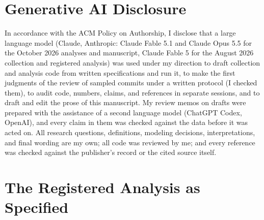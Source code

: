 \documentclass[acmsmall,screen,review,anonymous]{acmart}
\begin{document}
\section*{Generative AI Disclosure}
In accordance with the ACM Policy on Authorship, I disclose that a large language model (Claude, Anthropic: Claude Fable 5.1 and Claude Opus 5.5 for the October 2026 analyses and manuscript, Claude Fable 5 for the August 2026 collection and registered analysis) was used under my direction to draft collection and analysis code from written specifications and run it, to make the first judgments of the review of sampled commits under a written protocol (I checked them), to audit code, numbers, claims, and references in separate sessions, and to draft and edit the prose of this manuscript. My review memos on drafts were prepared with the assistance of a second language model (ChatGPT Codex, OpenAI), and every claim in them was checked against the data before it was acted on. All research questions, definitions, modeling decisions, interpretations, and final wording are my own; all code was reviewed by me; and every reference was checked against the publisher's record or the cited source itself.

\appendix


\section{The Registered Analysis as Specified}
\label{app:registered}
\end{document}
